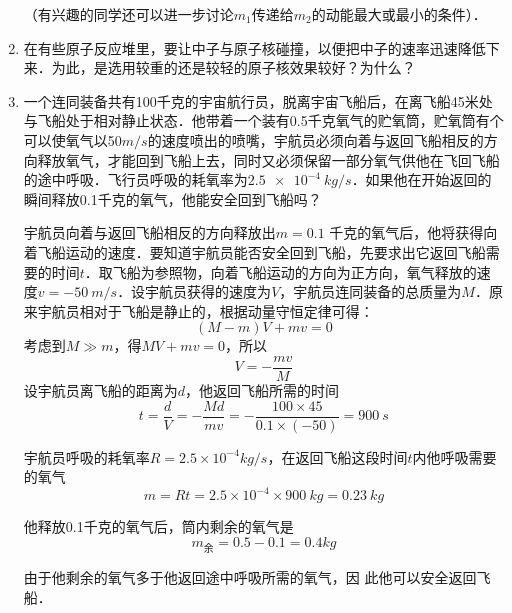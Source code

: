\begin{exercises}
\begin{enumerate}
          （有兴趣的同学还可以进一步讨论$m_1$传递给$m_2$的动能最大或最小的条件）．
    \item 在有些原子反应堆里，要让中子与原子核碰撞，以便把中子的速率迅速降低下来．为此，是选用较重的还是较轻的原子核效果较好？为什么？
    \item 一个连同装备共有100千克的宇宙航行员，脱离宇宙飞船后，在离飞船45米处与飞船处于相对静止状态．他带着一个装有0.5千克氧气的贮氧筒，贮氧筒有个可以使氧气以50$\si{m/s}$的速度喷出的喷嘴，宇航员必须向着与返回飞船相反的方向释放氧气，才能回到飞船上去，同时又必须保留一部分氧气供他在飞回飞船的途中呼吸．飞行员呼吸的耗氧率为$\qty{2.5e-4}{kg/s}$．如果他在开始返回的瞬间释放0.1千克的氧气，他能安全回到飞船吗？

          \begin{solution}
              宇航员向着与返回飞船相反的方向释放出$m=0.1$
              千克的氧气后，他将获得向着飞船运动的速度．要知道宇航员能否安全回到飞船，先要求出它返回飞船需要的时间$t$．取飞船为参照物，向着飞船运动的方向为正方向，氧气释放的速度$v=\qty{-50}{m/s}$．设宇航员获得的速度为$V$，宇航员连同装备的总质量为$M$．原来宇航员相对于飞船是静止的，根据动量守恒定律可得：
              \[(M-m)V+mv=0\]
              考虑到$M\gg m$，得$MV+mv=0$，所以
              \[V=-\frac{mv}{M}\]
              设宇航员离飞船的距离为$d$，他返回飞船所需的时间
              \[t=\frac{d}{V}=-\frac{Md}{mv}=-\frac{100\times 45}{0.1\times (-50)}=\qty{900}{s}\]

              宇航员呼吸的耗氧率$R=2.5\times 10^{-4}{ kg}/{ s}$，在返回飞船这段时间$t$内他呼吸需要的氧气
              \[m=Rt=2.5\times 10^{-4}\times \qty{900}{kg}=\qty{0.23}{kg}\]

              他释放0.1千克的氧气后，筒内剩余的氧气是
              \[ m_{\text{余}}=0.5-0.1=0.4{ kg}\]

              由于他剩余的氧气多于他返回途中呼吸所需的氧气，因
              此他可以安全返回飞船．
          \end{solution}


\end{enumerate}
\end{exercises}
